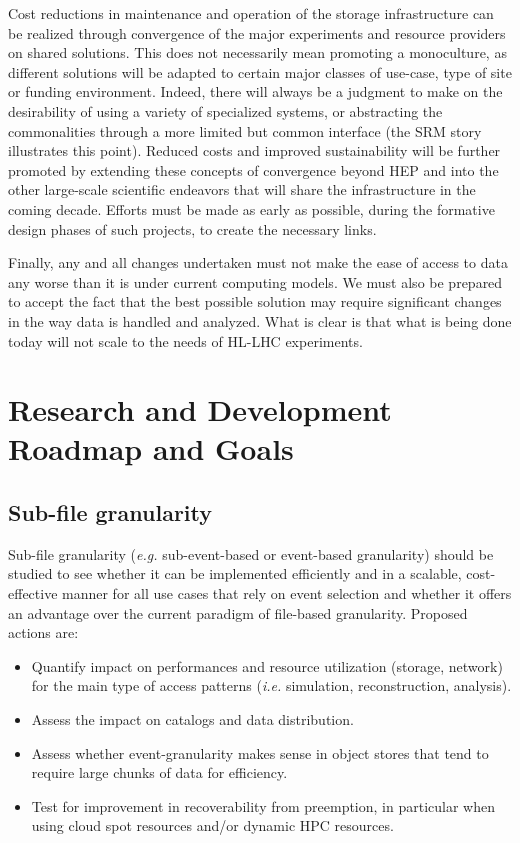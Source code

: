 \documentclass[12pt,a4paper]{article}
\begin{document}
Cost reductions in maintenance and operation of the storage
infrastructure can be realized through convergence of the major
experiments and resource providers on shared solutions. This does not
necessarily mean promoting a monoculture, as different solutions will be
adapted to certain major classes of use-case, type of site or funding
environment. Indeed, there will always be a judgment to make on the
desirability of using a variety of specialized systems, or abstracting
the commonalities through a more limited but common interface (the SRM
story illustrates this point). Reduced costs and improved sustainability
will be further promoted by extending these concepts of convergence
beyond HEP and into the other large-scale scientific endeavors that
will share the infrastructure in the coming decade. Efforts must be made
as early as possible, during the formative design phases of such
projects, to create the necessary links.

Finally, any and all changes undertaken must not make the ease of access
to data any worse than it is under current computing models. We must
also be prepared to accept the fact that the best possible solution may
require significant changes in the way data is handled and analyzed.
What is clear is that what is being done today will not scale to the
needs of HL-LHC experiments.

\section{Research and Development Roadmap and
Goals}\label{research-and-development-roadmap-and-goals}

\subsection{Sub-file granularity}\label{sub-file-granularity}
Sub-file granularity ({\it e.g.} sub-event-based or event-based granularity) should be studied
to see whether it can be implemented efficiently and in a scalable, cost-effective
manner for all use cases that rely on event selection and whether it offers an advantage
over the current paradigm of file-based granularity. Proposed actions are:

\begin{itemize}
\item Quantify impact on performances
  and resource utilization (storage, network) for the main type of
  access patterns ({\it i.e.} simulation, reconstruction, analysis).
\item Assess the impact on catalogs and
  data distribution.
\item Assess whether
  event-granularity makes sense in object stores that tend to require
  large chunks of data for efficiency.
\item Test for improvement in recoverability
  from preemption, in particular when using cloud spot resources and/or
  dynamic HPC resources.
\end{itemize}
\end{document}

